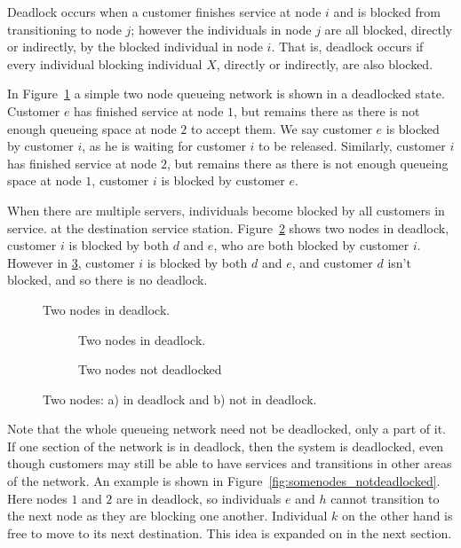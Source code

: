 \documentclass{article}
\begin{document}
Deadlock occurs when a customer finishes service at node $i$ and is blocked from transitioning to node $j$; however the individuals in node $j$ are all blocked, directly or indirectly, by the blocked individual in node $i$.
That is, deadlock occurs if every individual blocking individual $X$, directly or indirectly, are also blocked.

In Figure~\ref{fig:2in_deadlock} a simple two node queueing network is shown in a deadlocked state.
Customer $e$ has finished service at node $1$, but remains there as there is not
enough queueing space at node $2$ to accept them.
We say customer $e$ is blocked by customer $i$, as he is waiting for customer $i$ to be released.
Similarly, customer $i$ has finished service at node $2$, but remains there as there is not enough queueing space at node $1$, customer $i$ is blocked by customer $e$.

When there are multiple servers, individuals become blocked by all customers in
service. at the destination service station.
Figure~\ref{fig:inout_deadlock_in} shows two nodes in deadlock, customer $i$ is blocked by both $d$ and $e$, who are both blocked by customer $i$.
However in \ref{fig:inout_deadlock_out}, customer $i$ is blocked by both $d$ and $e$, and customer $d$ isn't blocked, and so there is no deadlock.

\begin{figure}[H]
  
  \caption{Two nodes in deadlock.}
  \label{fig:2in_deadlock}
\end{figure}

\begin{figure}[H]
\begin{subfigure}[b]{\textwidth}
  
  \caption{Two nodes in deadlock.}
  \label{fig:inout_deadlock_in}
\end{subfigure}
\begin{subfigure}[b]{\textwidth}
  
  \caption{Two nodes not deadlocked}
  \label{fig:inout_deadlock_out}
\end{subfigure}
\caption{Two nodes: a) in deadlock and b) not in deadlock.}
\label{fig:inout_deadlock}
\end{figure}

Note that the whole queueing network need not be deadlocked, only a part of it.
If one section of the network is in deadlock, then the system is deadlocked, even though customers may still be able to have services and transitions in other areas of the network.
An example is shown in Figure~\ref{fig:somenodes_notdeadlocked}.
Here nodes $1$ and $2$ are in deadlock, so individuals $e$ and $h$ cannot transition to the next node as they are blocking one another.
Individual $k$ on the other hand is free to move to its next destination.
This idea is expanded on in the next section.
\end{document}
